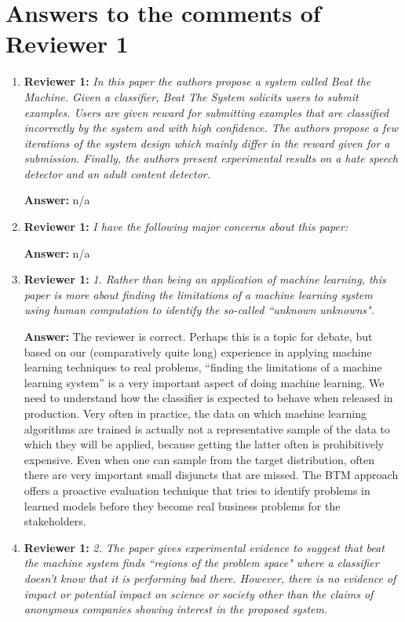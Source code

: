 \documentclass[letterpaper]{article}
\begin{document}
\section{Answers to the comments of Reviewer 1} \label{sec:reviewer1}


\begin{enumerate}

\item \textbf{Reviewer 1:} \emph{In this paper the authors propose a system called Beat the Machine. Given a classifier, Beat The System solicits users to submit examples. Users are given reward for submitting examples that are classified incorrectly by the system and with high confidence. The authors propose a few iterations of the system design which mainly differ in the reward given for a submission. Finally, the authors present experimental results on a hate speech detector and an adult content detector.}

\textbf{Answer:} n/a

\item \textbf{Reviewer 1:} \emph{ I have the following major concerns about this paper:}

\textbf{Answer:} n/a

\item \textbf{Reviewer 1:} \emph{1. Rather than being an application of machine learning, this paper is more about finding the limitations of a machine learning system using human computation to identify the so-called ``unknown unknowns".}

\textbf{Answer:} The reviewer is correct.  Perhaps this is a topic for debate, but based on our (comparatively quite long) experience in applying machine learning techniques to real problems, ``finding the limitations of a machine learning system'' is a very important aspect of doing machine learning.  We need to understand how the classifier is expected to behave when released in production.  Very often in practice, the data on which machine learning algorithms are trained is actually not a representative sample of the data to which they will be applied, because getting the latter often is prohibitively expensive.  Even when one can sample from the target distribution, often there are very important small disjuncts that are missed. The BTM approach offers a proactive evaluation technique that tries to identify problems in learned models before they become real business problems for the stakeholders.


\item \textbf{Reviewer 1:} \emph{2.  The paper gives experimental evidence to suggest that beat the machine system finds ``regions of the problem space" where a classifier doesn't know that it is performing bad there. However, there is no evidence of impact or potential impact on science or society other than the claims of anonymous companies showing interest in the proposed system.}


\end{enumerate}
\end{document}
